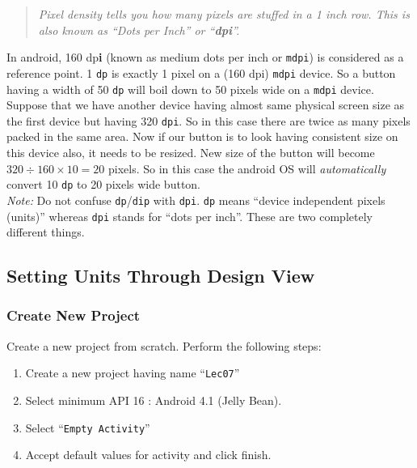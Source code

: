 \begin{quote}
	\textit{Pixel density tells you how many pixels are stuffed in a 1 inch row. This is also known as ``Dots per Inch'' or ``\textbf{dpi}''.}
\end{quote}

In android, 160 dp\textbf{i} (known as medium dots per inch or \texttt{mdpi}) is considered as a reference point. 1 \texttt{dp} is exactly 1 pixel on a (160 dpi) \texttt{mdpi} device. So a button having a width of 50 \texttt{dp} will boil down to 50 pixels wide on a \texttt{mdpi} device. 
Suppose that we have another device having almost same physical screen size as the first device but having 320 \texttt{dpi}. So in this case there are twice as many pixels packed in the same area. Now if our button is to look having consistent size on this device also, it needs to be resized. New size of the button will become $320\div160\times10 = 20$ pixels. So in this case the android OS will \textit{automatically} convert 10 \texttt{dp} to 20 pixels wide button. \\

\textit{Note:} Do not confuse \texttt{dp}/\texttt{dip} with \texttt{dpi}. \texttt{dp} means ``device independent pixels (units)'' whereas \texttt{dpi} stands for ``dots per inch''. These are two completely different things.\\

\subsection{Setting Units Through Design View}
\subsubsection{Create New Project}
\label{lec07:createProj}
Create a new project from scratch. Perform the following steps:
\begin{enumerate}
	\item Create a new project having name ``\texttt{Lec07}''
	\item Select minimum API 16 : Android 4.1 (Jelly Bean).
	\item Select ``\texttt{Empty Activity}''
	\item Accept default values for activity and click finish. \\
\end{enumerate}

